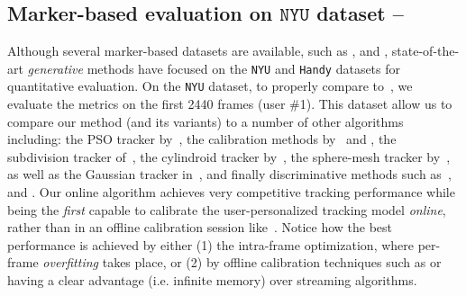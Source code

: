 \subsection{Marker-based evaluation on $\texttt{NYU}$ dataset --
}
\label{sec:evalstar}
Although several marker-based datasets are available, such as \cite{qian2014realtime}, \cite{sharp2015accurate} and \cite{yuan2017bighand}, state-of-the-art \emph{generative} methods have focused on the \texttt{NYU} \cite{tompson2014real} and \texttt{Handy} \cite{tkach2016sphere} datasets for quantitative evaluation. 
 
On the \texttt{NYU} dataset, to properly compare to~\cite{taylor2016joint}, we evaluate the metrics on the first 2440 frames (user \#1). 
This dataset allow us to compare our method (and its variants) to a number of other algorithms including: the PSO tracker by~\cite{sharp2015accurate}, the calibration methods by~\cite{khamis2015learning} and \cite{tan2016fits}, the subdivision tracker of~\cite{taylor2016joint}, the cylindroid tracker by~\cite{htrack}, the sphere-mesh tracker by~\cite{tkach2016sphere}, as well as the Gaussian tracker in~\cite{sridhar2015fast}, and finally discriminative methods such as~\cite{tompson2014real}, \cite{tang2015opening} and \cite{oberweger2015hands}. 
% 
% 
Our online algorithm achieves very competitive tracking performance while being the \emph{first} capable to calibrate the user-personalized tracking model \emph{online}, rather than in an offline calibration session like~\cite{taylor2016joint}. 
% 
Notice how the best performance is achieved by either (1) the intra-frame optimization, where per-frame \emph{overfitting} takes place, or (2) by offline calibration techniques such as \OfflineSoft{} or \cite{taylor2016joint} having a clear advantage (i.e. infinite memory) over streaming algorithms.  



